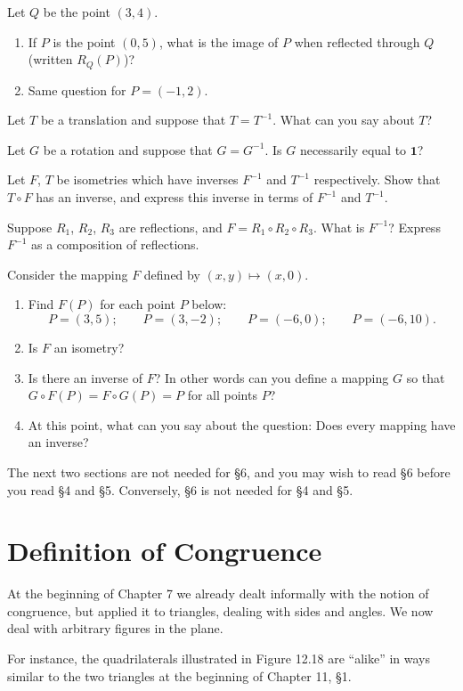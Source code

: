 \documentclass[12pt]{book} %
\begin{document}
\begin{ExerciseList}
\begin{ExerciseList}
\Exercise Let $Q$ be the point $(3,4)$.
\begin{enumerate}
\item[(a)] If $P$ is the point $(0,5)$, what is the image of $P$ when reflected through $Q$ (written $R_Q(P)$)?
\item[(b)] Same question for $P=(-1,2)$.
\end{enumerate}

\Exercise Let $T$ be a translation and suppose that $T=T^{-1}$. What can you say about $T$?

\Exercise Let $G$ be a rotation and suppose that $G=G^{-1}$. Is $G$ necessarily equal to $\mathbf{1}$?

\Exercise Let $F$, $T$ be isometries which have inverses $F^{-1}$ and $T^{-1}$ respectively. Show that $T\circ F$ has an inverse, and express this inverse in terms of $F^{-1}$ and $T^{-1}$.

\Exercise Suppose $R_1$, $R_2$, $R_3$ are reflections, and $F=R_1\circ R_2\circ R_3$. What is $F^{-1}$? Express $F^{-1}$ as a composition of reflections.

\Exercise Consider the mapping $F$ defined by $(x,y)\mapsto(x,0)$.
\begin{enumerate}
\item[(a)] Find $F(P)$ for each point $P$ below:
\[
P=(3,5);\qquad P=(3,-2);\qquad P=(-6,0);\qquad P=(-6,10).
\]
\item[(b)] Is $F$ an isometry?
\item[(c)] Is there an inverse of $F$? In other words can you define a mapping $G$ so that $G\circ F(P)=F\circ G(P)=P$ for all points $P$?
\item[(d)] At this point, what can you say about the question: Does every mapping have an inverse?
\end{enumerate}

The next two sections are not needed for \S6, and you may wish to read \S6 before you read \S4 and \S5. Conversely, \S6 is not needed for \S4 and \S5.

\section{Definition of Congruence}

At the beginning of Chapter 7 we already dealt informally with the notion of congruence, but applied it to triangles, dealing with sides and angles. We now deal with arbitrary figures in the plane.

For instance, the quadrilaterals illustrated in Figure 12.18 are ``alike'' in ways similar to the two triangles at the beginning of Chapter 11, \S1.


\end{ExerciseList}
\end{ExerciseList}
\end{document}
